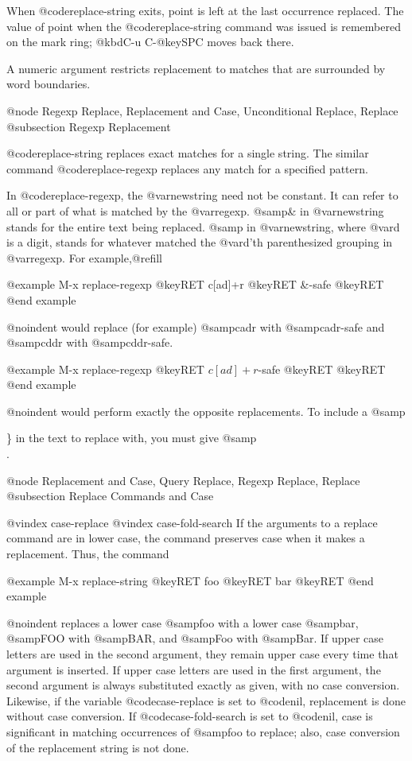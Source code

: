 {{{{{{{{{{{{{{  When @code{replace-string} exits, point is left at the last occurrence
replaced.  The value of point when the @code{replace-string} command was
issued is remembered on the mark ring; @kbd{C-u C-@key{SPC}} moves back
there.

  A numeric argument restricts replacement to matches that are surrounded
by word boundaries.

@node Regexp Replace, Replacement and Case, Unconditional Replace, Replace
@subsection Regexp Replacement

  @code{replace-string} replaces exact matches for a single string.  The
similar command @code{replace-regexp} replaces any match for a specified
pattern.

  In @code{replace-regexp}, the @var{newstring} need not be constant.  It
can refer to all or part of what is matched by the @var{regexp}.  @samp{\&}
in @var{newstring} stands for the entire text being replaced.
@samp{} in @var{newstring}, where @var{d} is a digit, stands for
whatever matched the @var{d}'th parenthesized grouping in @var{regexp}.
For example,@refill

@example
M-x replace-regexp @key{RET} c[ad]+r @key{RET} \&-safe @key{RET}
@end example

@noindent
would replace (for example) @samp{cadr} with @samp{cadr-safe} and @samp{cddr}
with @samp{cddr-safe}.

@example
M-x replace-regexp @key{RET} \(c[ad]+r\)-safe @key{RET} \1 @key{RET}
@end example

@noindent
would perform exactly the opposite replacements.  To include a @samp{\}
in the text to replace with, you must give @samp{\\}.

@node Replacement and Case, Query Replace, Regexp Replace, Replace
@subsection Replace Commands and Case

@vindex case-replace
@vindex case-fold-search
  If the arguments to a replace command are in lower case, the command
preserves case when it makes a replacement.  Thus, the command

@example
M-x replace-string @key{RET} foo @key{RET} bar @key{RET}
@end example

@noindent
replaces a lower case @samp{foo} with a lower case @samp{bar}, @samp{FOO}
with @samp{BAR}, and @samp{Foo} with @samp{Bar}.  If upper case letters are
used in the second argument, they remain upper case every time that
argument is inserted.  If upper case letters are used in the first
argument, the second argument is always substituted exactly as given, with
no case conversion.  Likewise, if the variable @code{case-replace} is set
to @code{nil}, replacement is done without case conversion.  If
@code{case-fold-search} is set to @code{nil}, case is significant in
matching occurrences of @samp{foo} to replace; also, case conversion of the
replacement string is not done.

}}}}}}}}}}}}}}}
